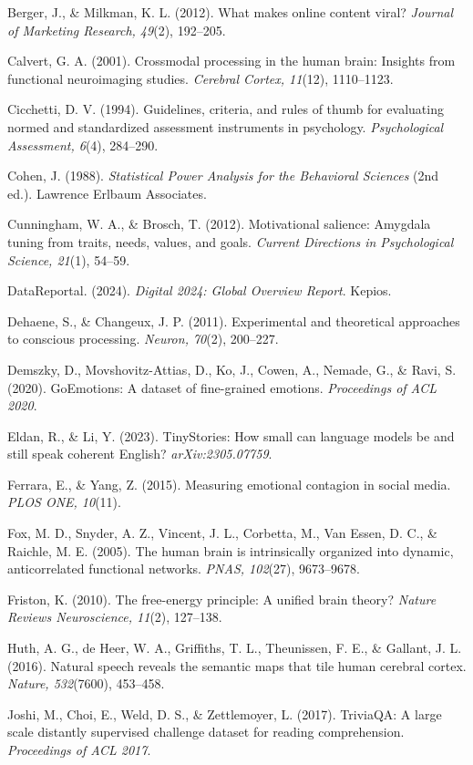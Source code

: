 \documentclass[11pt,letterpaper]{article}
\numberwithin{equation}{section}
\begin{document}
Berger, J., \& Milkman, K. L. (2012). What makes online content viral? \textit{Journal of Marketing Research, 49}(2), 192--205.

Calvert, G. A. (2001). Crossmodal processing in the human brain: Insights from functional neuroimaging studies. \textit{Cerebral Cortex, 11}(12), 1110--1123.

Cicchetti, D. V. (1994). Guidelines, criteria, and rules of thumb for evaluating normed and standardized assessment instruments in psychology. \textit{Psychological Assessment, 6}(4), 284--290.

Cohen, J. (1988). \textit{Statistical Power Analysis for the Behavioral Sciences} (2nd ed.). Lawrence Erlbaum Associates.

Cunningham, W. A., \& Brosch, T. (2012). Motivational salience: Amygdala tuning from traits, needs, values, and goals. \textit{Current Directions in Psychological Science, 21}(1), 54--59.

DataReportal. (2024). \textit{Digital 2024: Global Overview Report}. Kepios.

Dehaene, S., \& Changeux, J. P. (2011). Experimental and theoretical approaches to conscious processing. \textit{Neuron, 70}(2), 200--227.

Demszky, D., Movshovitz-Attias, D., Ko, J., Cowen, A., Nemade, G., \& Ravi, S. (2020). GoEmotions: A dataset of fine-grained emotions. \textit{Proceedings of ACL 2020}.

Eldan, R., \& Li, Y. (2023). TinyStories: How small can language models be and still speak coherent English? \textit{arXiv:2305.07759}.

Ferrara, E., \& Yang, Z. (2015). Measuring emotional contagion in social media. \textit{PLOS ONE, 10}(11).

Fox, M. D., Snyder, A. Z., Vincent, J. L., Corbetta, M., Van Essen, D. C., \& Raichle, M. E. (2005). The human brain is intrinsically organized into dynamic, anticorrelated functional networks. \textit{PNAS, 102}(27), 9673--9678.

Friston, K. (2010). The free-energy principle: A unified brain theory? \textit{Nature Reviews Neuroscience, 11}(2), 127--138.

Huth, A. G., de Heer, W. A., Griffiths, T. L., Theunissen, F. E., \& Gallant, J. L. (2016). Natural speech reveals the semantic maps that tile human cerebral cortex. \textit{Nature, 532}(7600), 453--458.

Joshi, M., Choi, E., Weld, D. S., \& Zettlemoyer, L. (2017). TriviaQA: A large scale distantly supervised challenge dataset for reading comprehension. \textit{Proceedings of ACL 2017}.
\end{document}

